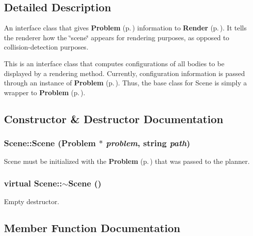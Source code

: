 \subsection{Detailed Description}
An interface class that gives {\bf Problem} {\rm (p.\,\pageref{classProblem})} information to {\bf Render} {\rm (p.\,\pageref{classRender})}. It tells the renderer how the \char`\"{}scene\char`\"{} appears for rendering purposes, as opposed to collision-detection purposes.

This is an interface class that computes configurations of all bodies to be displayed by a rendering method. Currently, configuration information is passed through an instance of {\bf Problem} {\rm (p.\,\pageref{classProblem})}. Thus, the base class for Scene is simply a wrapper to {\bf Problem} {\rm (p.\,\pageref{classProblem})}. 



\subsection{Constructor \& Destructor Documentation}
\subsubsection{\setlength{\rightskip}{0pt plus 5cm}Scene::Scene ({\bf Problem} $\ast$ {\em problem}, string {\em path})}\label{classScene_a0}


Scene must be initialized with the {\bf Problem} {\rm (p.\,\pageref{classProblem})} that was passed to the planner.

\subsubsection{\setlength{\rightskip}{0pt plus 5cm}virtual Scene::$\sim$Scene ()\hspace{0.3cm}{\tt  [inline, virtual]}}\label{classScene_a1}


Empty destructor.



\subsection{Member Function Documentation}
